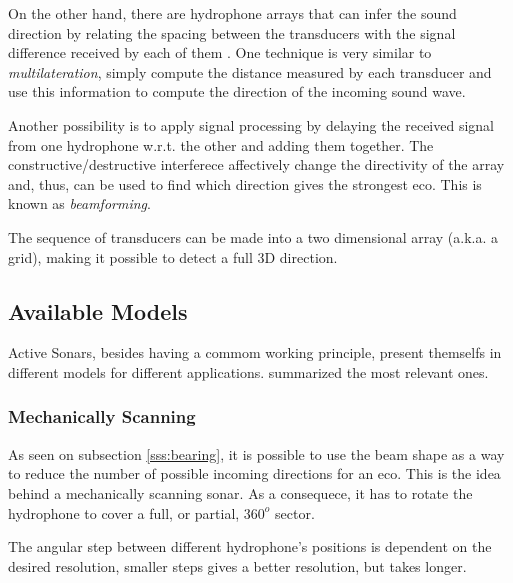 On the other hand, there are hydrophone arrays that can infer the sound
direction by relating the spacing between the transducers with the signal
difference received by each of them \cite{bearing,beamforming}. One technique is
very similar to \textit{multilateration}, simply compute the distance measured
by each transducer and use this information to compute the direction of the
incoming sound wave.


Another possibility is to apply signal processing by delaying the received
signal from one hydrophone w.r.t. the other and adding them together. The
constructive/destructive interferece affectively change the directivity of the
array and, thus, can be used to find which direction gives the strongest eco.
This is known as \textit{beamforming}.

The sequence of transducers can be made into a two dimensional array
(a.k.a. a grid), making it possible to detect a full 3D direction.

\subsection{Available Models}
\label{ss:avaible_models}
 
Active Sonars, besides having a commom working principle, present themselfs in
different models for different applications. \citet{sonars:16} summarized the
most relevant ones.

\subsubsection{Mechanically Scanning}

As seen on subsection \ref{sss:bearing}, it is possible to use the beam shape as
a way to reduce the number of possible incoming directions for an eco. This is
the idea behind a mechanically scanning sonar. As a consequece, it has to rotate
the hydrophone to cover a full, or partial, $360^o$ sector.

The angular step between different hydrophone's positions is dependent on the
desired resolution, smaller steps gives a better resolution, but takes longer.

